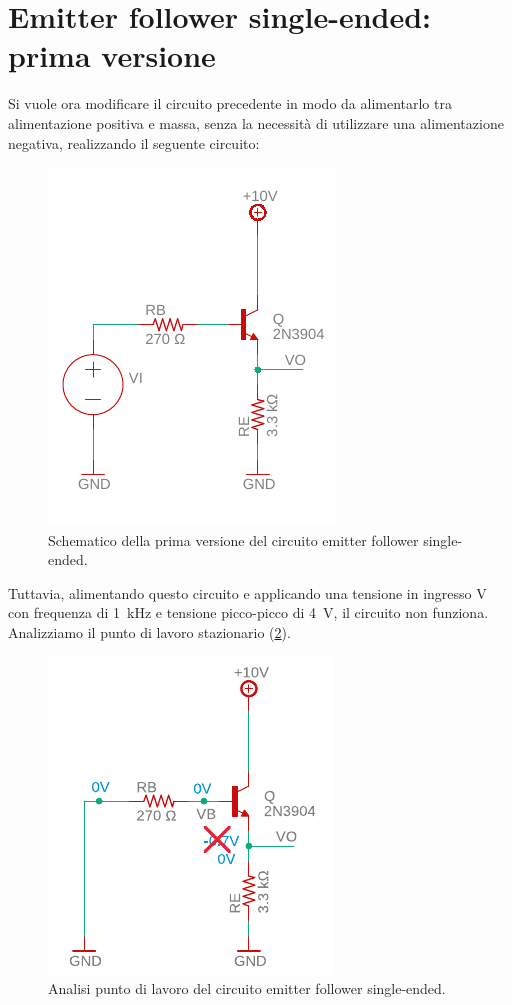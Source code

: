 \section{Emitter follower single-ended: prima versione}
Si vuole ora modificare il circuito precedente in modo da alimentarlo tra alimentazione positiva e massa, senza la necessità di utilizzare una alimentazione negativa, realizzando il seguente circuito:
\begin{figure}[h!]
	\centering
	\includegraphics[width=0.4\linewidth]{./OtherFiles/Laboratorio 2/emitter follower}
	\caption{Schematico della prima versione del circuito emitter follower single-ended.}
	\label{fig:emitterfollwer_se}
\end{figure}
Tuttavia, alimentando questo circuito e applicando una tensione in ingresso V con frequenza di \SI{1}{\kilo\hertz} e tensione picco-picco di \SI{4}{\volt}, il circuito non funziona. Analizziamo il punto di lavoro stazionario (\Fig\ref{fig:emitterfollwer_se_DC}).
\begin{figure}[h!]
	\centering
	\includegraphics[width=0.4\linewidth]{./OtherFiles/Laboratorio 2/emitter follower_punto di lavoro-printout}
	\caption{Analisi punto di lavoro del circuito emitter follower single-ended.}
	\label{fig:emitterfollwer_se_DC}
\end{figure}
